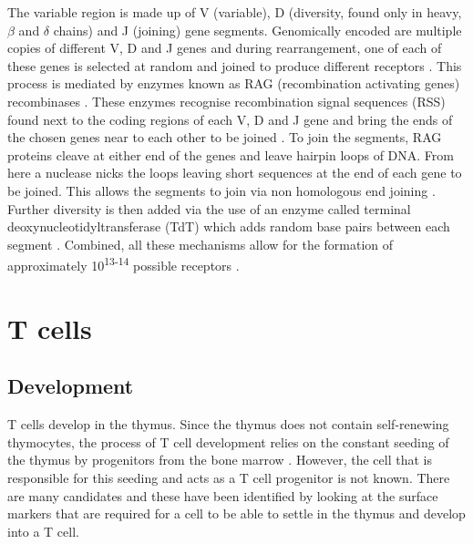 The variable region is made up of V (variable), D (diversity, found only in heavy, $\beta$ and $\delta$ chains) and J (joining) gene segments.
Genomically encoded are multiple copies of different V, D and J genes and during rearrangement, one of each of these genes is selected at random and joined to produce different receptors \citep{Fugmann2014}.
This process is mediated by enzymes known as RAG (recombination activating genes) recombinases \citep{Parkin2001}.
These enzymes recognise recombination signal sequences (RSS) found next to the coding regions of each V, D and J gene and bring the ends of the chosen genes near to each other to be joined \citep{Fugmann2014, Oettinger1999}.
To join the segments, RAG proteins cleave at either end of the genes and leave hairpin loops of DNA.
From here a nuclease nicks the loops leaving short sequences at the end of each gene to be joined.
This allows the segments to join via non homologous end joining \citep{Schatz2011}.
Further diversity is then added via the use of an enzyme called terminal deoxynucleotidyltransferase (TdT) which adds random base pairs between each segment \citep{Motea2010}. 
Combined, all these mechanisms allow for the formation of approximately 10\textsuperscript{13-14} possible receptors \citep{KubyImmunology, Motea2010}.







\section{T cells}



\subsection{Development}
\label{subsec:Tcelldevelopment}

T cells develop in the thymus.
Since the thymus does not contain self-renewing thymocytes, the process of T cell development relies on the constant seeding of the thymus by progenitors from the bone marrow \citep{Zlotoff2011, Heinzel2007}.
However, the cell that is responsible for this seeding and acts as a T cell progenitor is not known.
There are many candidates and these have been identified by looking at the surface markers that are required for a cell to be able to settle in the thymus and develop into a T cell.

